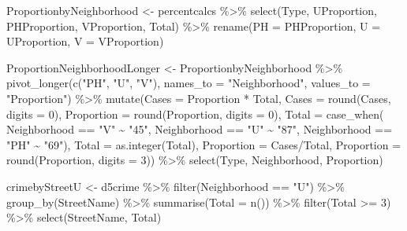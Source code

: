 \documentclass[
]{article}
\newenvironment{Shaded}{\begin{snugshade}}{\end{snugshade}}
\newcommand{\AttributeTok}[1]{\textcolor[rgb]{0.77,0.63,0.00}{#1}}
\newcommand{\DecValTok}[1]{\textcolor[rgb]{0.00,0.00,0.81}{#1}}
\newcommand{\FunctionTok}[1]{\textcolor[rgb]{0.00,0.00,0.00}{#1}}
\newcommand{\NormalTok}[1]{#1}
\newcommand{\OtherTok}[1]{\textcolor[rgb]{0.56,0.35,0.01}{#1}}
\newcommand{\SpecialCharTok}[1]{\textcolor[rgb]{0.00,0.00,0.00}{#1}}
\newcommand{\StringTok}[1]{\textcolor[rgb]{0.31,0.60,0.02}{#1}}
\begin{document}
\begin{Shaded}
\begin{Highlighting}[]
\NormalTok{ProportionbyNeighborhood }\OtherTok{\textless{}{-}}\NormalTok{ percentcalcs }\SpecialCharTok{\%\textgreater{}\%}
  \FunctionTok{select}\NormalTok{(Type, UProportion, PHProportion, VProportion, Total) }\SpecialCharTok{\%\textgreater{}\%}
  \FunctionTok{rename}\NormalTok{(}\AttributeTok{PH =}\NormalTok{ PHProportion,}
         \AttributeTok{U =}\NormalTok{ UProportion,}
         \AttributeTok{V =}\NormalTok{ VProportion)}

\NormalTok{ProportionNeighborhoodLonger }\OtherTok{\textless{}{-}}\NormalTok{ ProportionbyNeighborhood }\SpecialCharTok{\%\textgreater{}\%}
  \FunctionTok{pivot\_longer}\NormalTok{(}\FunctionTok{c}\NormalTok{(}\StringTok{"PH"}\NormalTok{, }\StringTok{"U"}\NormalTok{, }\StringTok{"V"}\NormalTok{), }\AttributeTok{names\_to =} \StringTok{"Neighborhood"}\NormalTok{, }\AttributeTok{values\_to =} \StringTok{"Proportion"}\NormalTok{) }\SpecialCharTok{\%\textgreater{}\%}
  \FunctionTok{mutate}\NormalTok{(}\AttributeTok{Cases =}\NormalTok{ Proportion }\SpecialCharTok{*}\NormalTok{ Total,}
         \AttributeTok{Cases =} \FunctionTok{round}\NormalTok{(Cases, }\AttributeTok{digits =} \DecValTok{0}\NormalTok{), }
        \AttributeTok{Proportion =} \FunctionTok{round}\NormalTok{(Proportion, }\AttributeTok{digits =} \DecValTok{0}\NormalTok{),}
        \AttributeTok{Total =} \FunctionTok{case\_when}\NormalTok{(}
\NormalTok{  Neighborhood }\SpecialCharTok{==} \StringTok{"V"} \SpecialCharTok{\textasciitilde{}} \StringTok{"45"}\NormalTok{,}
\NormalTok{  Neighborhood }\SpecialCharTok{==} \StringTok{"U"} \SpecialCharTok{\textasciitilde{}} \StringTok{"87"}\NormalTok{,}
\NormalTok{  Neighborhood }\SpecialCharTok{==} \StringTok{"PH"} \SpecialCharTok{\textasciitilde{}} \StringTok{"69"}\NormalTok{),}
       \AttributeTok{Total =} \FunctionTok{as.integer}\NormalTok{(Total),}
       \AttributeTok{Proportion =}\NormalTok{ Cases}\SpecialCharTok{/}\NormalTok{Total,}
       \AttributeTok{Proportion =} \FunctionTok{round}\NormalTok{(Proportion, }\AttributeTok{digits =} \DecValTok{3}\NormalTok{)) }\SpecialCharTok{\%\textgreater{}\%}
  \FunctionTok{select}\NormalTok{(Type, Neighborhood, Proportion)}


\NormalTok{crimebyStreetU }\OtherTok{\textless{}{-}}\NormalTok{ d5crime }\SpecialCharTok{\%\textgreater{}\%}
  \FunctionTok{filter}\NormalTok{(Neighborhood }\SpecialCharTok{==} \StringTok{"U"}\NormalTok{) }\SpecialCharTok{\%\textgreater{}\%}
  \FunctionTok{group\_by}\NormalTok{(StreetName) }\SpecialCharTok{\%\textgreater{}\%}
  \FunctionTok{summarise}\NormalTok{(}\AttributeTok{Total =} \FunctionTok{n}\NormalTok{()) }\SpecialCharTok{\%\textgreater{}\%}
  \FunctionTok{filter}\NormalTok{(Total  }\SpecialCharTok{\textgreater{}=} \DecValTok{3}\NormalTok{) }\SpecialCharTok{\%\textgreater{}\%}
  \FunctionTok{select}\NormalTok{(StreetName, Total) }
\end{Highlighting}
\end{Shaded}
\end{document}

